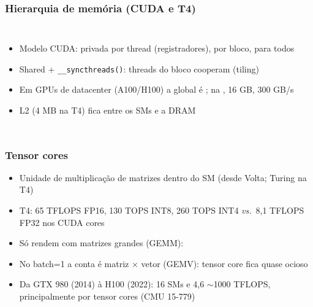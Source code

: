 \documentclass[11pt, aspectratio=169, usepdftitle=false]{beamer}
\newcommand{\vs}{\textit{vs.}\ }
\begin{document}
\begin{frame}
\frametitle{Hierarquia de memória (CUDA e T4)}
\begin{columns}[T]
\begin{itemize}
\item Modelo CUDA: privada por thread (registradores),  por bloco,  para todos
\item Shared + \texttt{\_\_syncthreads()}: threads do bloco cooperam (tiling)
\item Em GPUs de datacenter (A100/H100) a global é ; na , 16 GB, 300 GB/s
\item L2 (4 MB na T4) fica entre os SMs e a DRAM
\end{itemize}
\centering
{}
\end{columns}
\end{frame}

\begin{frame}
\frametitle{Tensor cores}
\begin{itemize}
\item Unidade de multiplicação de matrizes dentro do SM (desde Volta; Turing na T4)
\item T4: 65 TFLOPS FP16, 130 TOPS INT8, 260 TOPS INT4 \vs 8,1 TFLOPS FP32 nos CUDA cores
\item Só rendem com matrizes grandes (GEMM): 
\item No  batch=1 a conta é matriz $\times$ vetor (GEMV): tensor core fica quase ocioso
\item Da GTX 980 (2014) à H100 (2022): 16  SMs e 4,6 \so $\sim$1000 TFLOPS, principalmente por tensor cores (CMU 15-779)
\end{itemize}
\end{frame}
\end{document}
